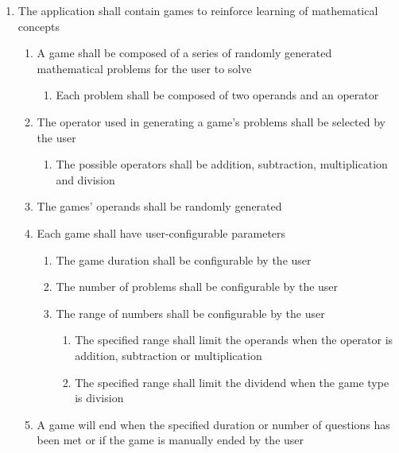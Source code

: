 \documentclass[12pt,letterpaper,oneside]{article}
\begin{document}
\begin{enumerate}
	\item	%
		The application shall contain games to reinforce learning of mathematical concepts
		\begin{enumerate}
			\item	%
				A game shall be composed of a series of randomly generated mathematical problems for the user to solve
				\begin{enumerate}
					\item %
						Each problem shall be composed of two operands and an operator
				\end{enumerate}
			\item	%
				The operator used in generating a game's problems shall be selected by the user
				\begin{enumerate}
					\item %
						The possible operators shall be addition, subtraction, multiplication and division
				\end{enumerate}
			\item	%
				The games' operands shall be randomly generated
			\item	%
				Each game shall have user-configurable parameters
				\begin{enumerate}
					\item	%
						The game duration shall be configurable by the user
					\item	%
						The number of problems shall be configurable by the user
					\item	%
						The range of numbers shall be configurable by the user
						\begin{enumerate}
							\item %
								The specified range shall limit the operands when the operator is addition, subtraction or multiplication
							\item %
								The specified range shall limit the dividend when the game type is division
						\end{enumerate}
				\end{enumerate}
			\item	%
				A game will end when the specified duration or number of questions has been met or if the game is manually ended by the user
		\end{enumerate}


\end{enumerate}
\end{document}
